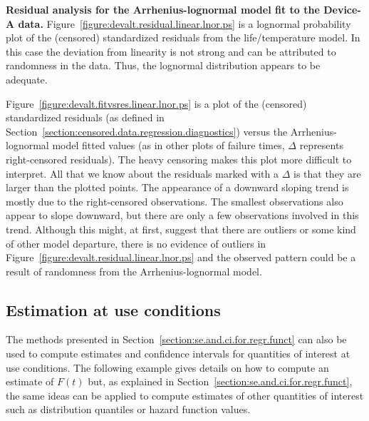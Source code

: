 \begin{example}
{\bf Residual analysis for the Arrhenius-lognormal model fit to the
Device-A data.} 
Figure~\ref{figure:devalt.residual.linear.lnor.ps} is a lognormal
probability plot of the (censored) standardized residuals from the
life/temperature model. In this case the deviation from linearity 
is not strong and can be attributed to randomness in the data. Thus,
the lognormal distribution appears to be adequate.

Figure~\ref{figure:devalt.fitvsres.linear.lnor.ps} is a plot of the
(censored) standardized residuals (as defined in
Section~\ref{section:censored.data.regression.diagnostics}) versus
the Arrhenius-lognormal model fitted values (as in other plots of failure
times, $\Delta$ represents right-censored residuals).  The heavy
censoring makes this plot more difficult to interpret.  All that we
know about the residuals marked with a $\Delta$ is that they are
larger than the plotted points. The appearance of a downward sloping
trend is mostly due to the right-censored observations. The smallest
observations also appear to slope downward, but there are only a few
observations involved in this trend. Although this might, at first,
suggest that there are outliers or some kind of other model
departure, there is no evidence of outliers in
Figure~\ref{figure:devalt.residual.linear.lnor.ps} and the observed
pattern could be a result of randomness from the
Arrhenius-lognormal model.
\end{example}

\subsection{Estimation at use conditions}
The methods presented in
Section~\ref{section:se.and.ci.for.regr.funct} can also be used to
compute estimates and
confidence intervals for quantities of interest at use
conditions.  The following example gives details on how to compute
an estimate of $F(t)$ but, as explained in
Section~\ref{section:se.and.ci.for.regr.funct}, the same ideas can be
applied to compute estimates of other quantities of interest such as
distribution quantiles or hazard function values.

